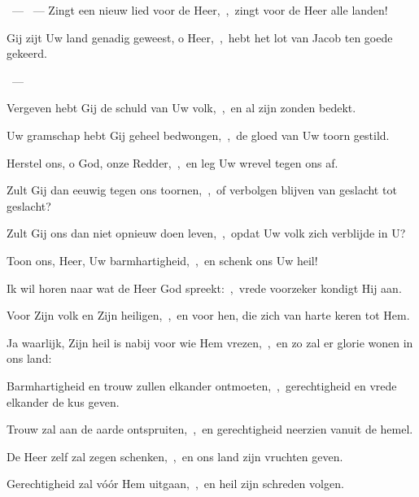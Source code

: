 \documentclass[12pt,twoside,a5paper]{article}
\begin{document}
\begin{halfparskip}
  ~--- ~---  Zingt een nieuw lied voor de Heer,~\sep\ zingt voor de Heer alle landen!
\end{halfparskip}


\begin{halfparskip}
   Gij zijt Uw land genadig geweest, o Heer,~\sep\ hebt het lot van Jacob ten goede gekeerd.

  ~--- 

  Vergeven hebt Gij de schuld van Uw volk,~\sep\ en al zijn zonden bedekt.

  Uw gramschap hebt Gij geheel bedwongen,~\sep\ de gloed van Uw toorn gestild.

  Herstel ons, o God, onze Redder,~\sep\ en leg Uw wrevel tegen ons af.

  Zult Gij dan eeuwig tegen ons toornen,~\sep\ of verbolgen blijven van geslacht tot geslacht?

  Zult Gij ons dan niet opnieuw doen leven,~\sep\ opdat Uw volk zich verblijde in U?

  Toon ons, Heer, Uw barmhartigheid,~\sep\ en schenk ons Uw heil!

  Ik wil horen naar wat de Heer God spreekt:~\sep\ vrede voorzeker kondigt Hij aan.

  Voor Zijn volk en Zijn heiligen,~\sep\ en voor hen, die zich van harte keren tot Hem.

  Ja waarlijk, Zijn heil is nabij voor wie Hem vrezen,~\sep\ en zo zal er glorie wonen in ons land:

  Barmhartigheid en trouw zullen elkander ontmoeten,~\sep\ gerechtigheid en vrede elkander de kus geven.

  Trouw zal aan de aarde ontspruiten,~\sep\ en gerechtigheid neerzien vanuit de hemel.

  De Heer zelf zal zegen schenken,~\sep\ en ons land zijn vruchten geven.

  Gerechtigheid zal vóór Hem uitgaan,~\sep\ en heil zijn schreden volgen.
\end{halfparskip}
\end{document}
